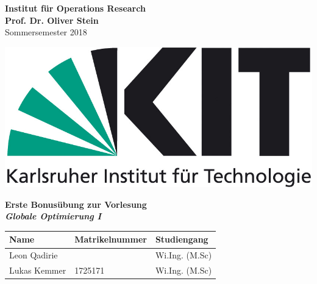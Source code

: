 \documentclass[ngerman, a4paper,12pt]{article}
\begin{document}
\begin{flushleft}
\vspace*{-100pt}
\textbf{Institut f\"ur Operations Research \\
Prof. Dr. Oliver Stein \\}
Sommersemester 2018
\vspace*{15pt}
\end{flushleft}

\begin{flushright}
\vspace*{-80pt}
\includegraphics[scale=0.5]{kit_logo}
\vspace*{15pt}
\end{flushright}

\begin{center}
\textbf{Erste Bonusübung zur Vorlesung \\
\emph{Globale Optimierung I}}        
\end{center}

\begin{table}[h]
	\centering
	\begin{tabularx}{\textwidth}{X X X}
		Name & Matrikelnummer & Studiengang \\
		\toprule
		Leon Qadirie					& & Wi.Ing. (M.Sc)\\
		Lukas Kemmer 				& 1725171			& Wi.Ing. (M.Sc)\\
		\bottomrule
	\end{tabularx}

\end{table}
\end{document}
